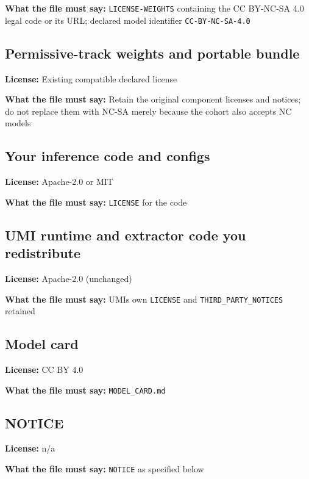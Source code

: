\documentclass[10pt,a4paper]{article}
\begin{document}
\textbf{What the file must say:} \texttt{LICENSE-WEIGHTS} containing the
CC BY-NC-SA 4.0 legal code or its URL; declared model identifier
\texttt{CC-BY-NC-SA-4.0}

\subsection{Permissive-track weights and portable
bundle}\label{permissive-track-weights-and-portable-bundle}

\textbf{License:} Existing compatible declared license

\textbf{What the file must say:} Retain the original component licenses
and notices; do not replace them with NC-SA merely because the cohort
also accepts NC models

\subsection{Your inference code and
configs}\label{your-inference-code-and-configs}

\textbf{License:} Apache-2.0 or MIT

\textbf{What the file must say:} \texttt{LICENSE} for the code

\subsection{UMI runtime and extractor code you
redistribute}\label{umi-runtime-and-extractor-code-you-redistribute}

\textbf{License:} Apache-2.0 (unchanged)

\textbf{What the file must say:} UMI\textquotesingle s own
\texttt{LICENSE} and \texttt{THIRD\_PARTY\_NOTICES} retained

\subsection{Model card}\label{model-card}

\textbf{License:} CC BY 4.0

\textbf{What the file must say:} \texttt{MODEL\_CARD.md}

\subsection{NOTICE}\label{notice}

\textbf{License:} n/a

\textbf{What the file must say:} \texttt{NOTICE} as specified below
\end{document}
